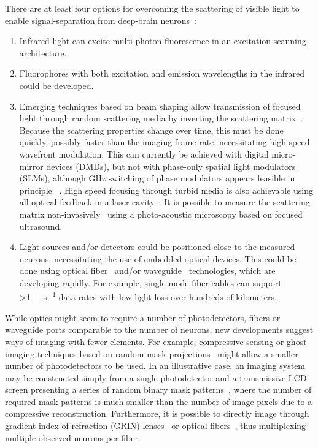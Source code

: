 There are at least four options for overcoming the scattering of visible light to enable signal-separation from deep-brain neurons~\cite{alivisatos2012brain, alivisatos13}:

\begin{enumerate}
\item Infrared light can excite multi-photon fluorescence in an excitation-scanning architecture.
\item Fluorophores with both excitation and emission wavelengths in the infrared could be developed.
\item Emerging techniques based on beam shaping allow transmission of focused light through random scattering media by inverting the scattering matrix~\cite{conkey12}.
Because the scattering properties change over time, this must be done quickly, possibly faster than the imaging frame rate, necessitating high-speed wavefront modulation.
This can currently be achieved with digital micro-mirror devices (DMDs), but not with phase-only spatial light modulators (SLMs), although GHz switching of phase modulators appears feasible in principle ~\cite{alivisatos13}. High speed focusing through turbid media is also achievable using all-optical feedback in a laser cavity~\cite{Nixon2013}.
It is possible to measure the scattering matrix non-invasively~\cite{Chaigne2013} using a photo-acoustic microscopy based on focused ultrasound.
\item Light sources and/or detectors could be positioned close to the measured neurons, necessitating the use of embedded optical devices.
This could be done using optical fiber~\cite{mahalati13} and/or waveguide~\cite{zorzos10,zorzos12} technologies, which are developing rapidly.
For example, single-mode fiber cables can support \SI{>1}{\tera\byte\per\second} data rates with low light loss over hundreds of kilometers.
\end{enumerate}

While optics might seem to require a number of photodetectors, fibers or waveguide ports comparable to the number of neurons, new developments suggest ways of imaging with fewer elements.
For example, compressive sensing or ghost imaging techniques based on random mask projections~\cite{wakin06,studer12,tian11,sun13} might allow a smaller number of photodetectors to be used.
In an illustrative case, an imaging system may be constructed simply from a single photodetector and a transmissive LCD screen presenting a series of random binary mask patterns~\cite{huang13}, where the number of required mask patterns is much smaller than the number of image pixels due to a compressive reconstruction.
Furthermore, it is possible to directly image through gradient index of refraction (GRIN) lenses~\cite{murray12} or optical fibers~\cite{mahalati13,kang10,flusberg05}, thus multiplexing multiple observed neurons per fiber.

